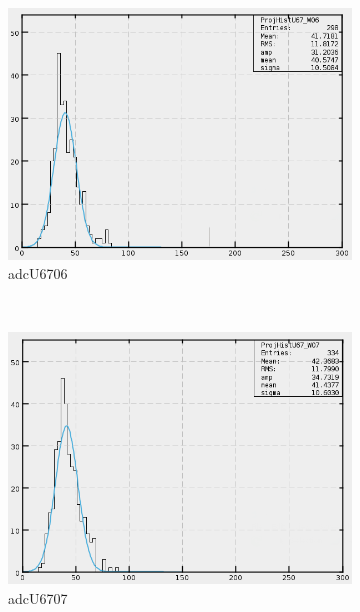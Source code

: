 \begin{figure}[h]
\begin{subfigure}[h]{0.3\textwidth}
        \includegraphics[width=\textwidth, keepaspectratio = true]{adcU67_06}
        \caption{adcU6706}
        \label{fig:adcU67_06}
    \end{subfigure}
    ~
    \begin{subfigure}[h]{0.3\textwidth}
        \centering
        \includegraphics[width=\textwidth, keepaspectratio = true]{adcU67_07}
        \caption{adcU6707}
        \label{fig:adcU67_07}
    \end{subfigure}
    \\
    \begin{subfigure}[h]{0.3\textwidth}
        \centering

\end{subfigure}
\end{figure}
